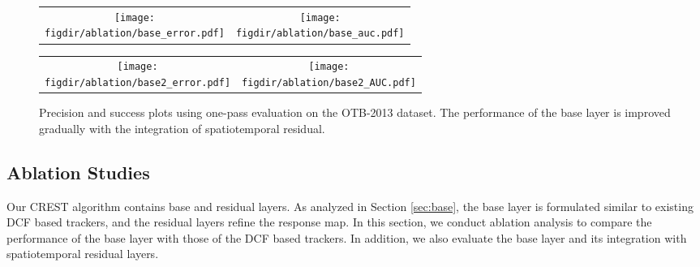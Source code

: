 \documentclass[10pt,twocolumn,letterpaper]{article}
\newcommand{\figdir}{figures}
\newcommand{\ryn}[1]{{\color{black}{#1}}}
\begin{document}
\def\swtwo{0.495\linewidth}
\renewcommand{\tabcolsep}{.1pt}
\begin{figure}[t]
\begin{center}
\begin{tabular}{cc}
\texttt{[image: \\figdir/ablation/base\_error.pdf]}&
\texttt{[image: \\figdir/ablation/base\_auc.pdf]}
\end{tabular}
\end{center}
\vspace{-5mm}
\caption{Precision and success plots using one-pass evaluation on the OTB-2013 dataset.
%
The performance of the base layer without scale estimation is similar \ryn{to} that of HCFT \cite{chao-iccv15-HCF} on average.}
\label{fig:abla1}
\begin{center}
\begin{tabular}{cc}
\texttt{[image: \\figdir/ablation/base2\_error.pdf]}&
\texttt{[image: \\figdir/ablation/base2\_AUC.pdf]}
\end{tabular}
\end{center}
\vspace{-5mm}
\caption{Precision and success plots using one-pass evaluation on the OTB-2013 dataset.
%
The performance of the base layer is improved gradually with the integration of spatiotemporal residual.}
\label{fig:abla2}
\vspace{-3mm}
\end{figure}



\subsection{Ablation Studies}\label{sec:ablation}

Our CREST algorithm contains base and residual layers. As analyzed in Section \ref{sec:base}, the base layer is formulated similar to existing DCF based trackers, and the residual layers refine the response map. In this section, we conduct ablation analysis to compare the performance of the base layer with those of the DCF based trackers. In addition, we also evaluate the base layer and its integration with spatiotemporal residual layers.
\end{document}
